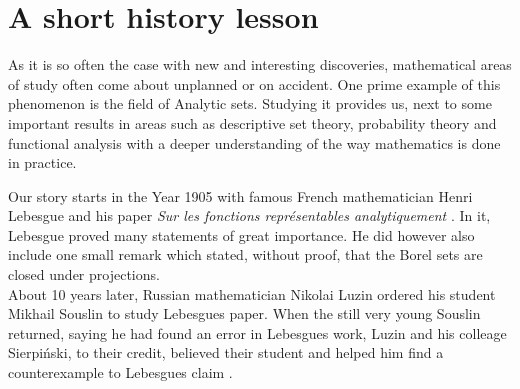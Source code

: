 \documentclass[10pt, a4paper, titlepage]{article}
\numberwithin{equation}{section}
\begin{document}
\hypersetup{pageanchor=false}


\newpage

\thispagestyle{empty}



\newpage

\thispagestyle{empty}
\tableofcontents

\newpage
\hypersetup{pageanchor=true}
\renewcommand{\thepage}{ \arabic{page} }

\setcounter{page}{1}
\onehalfspacing







\section{A short history lesson}
As it is so often the case with new and interesting discoveries, mathematical areas of study often come about unplanned or on accident. 
One prime example of this phenomenon is the field of Analytic sets. 
Studying it provides us, next to some important results in areas such as descriptive set theory, probability theory and functional analysis with a deeper understanding of the way mathematics is done in practice.

Our story starts in the Year 1905 with famous French mathematician Henri Lebesgue and his paper \textit{Sur les fonctions représentables analytiquement} \cite{lebesgue1905}. 
In it, Lebesgue proved many statements of great importance. 
He did however also include one small remark which stated, without proof, that the Borel sets are closed under projections. \\
About 10 years later, Russian mathematician Nikolai Luzin ordered his student Mikhail Souslin to study Lebesgues paper. 
When the still very young Souslin returned, saying he had found an error in Lebesgues work, Luzin and his colleage Sierpiński, to their credit, believed their student and helped him find a counterexample to Lebesgues claim \cite{sierpinski1950}.
\end{document}
